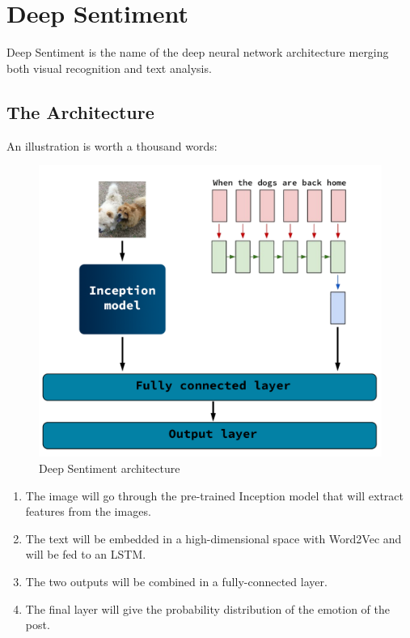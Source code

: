 \chapter{Deep Sentiment}

Deep Sentiment is the name of the deep neural network architecture merging both visual recognition and text analysis.

\section{The Architecture}
An illustration is worth a thousand words:

\begin{figure}[H]
    \centering
    \includegraphics[width=\textwidth]{Images/deep-sentiment.png}
    \caption{Deep Sentiment architecture}
\end{figure}

\begin{enumerate}
    \item The image will go through the pre-trained Inception model that will extract features from the images.
    \item The text will be embedded in a high-dimensional space with Word2Vec and will be fed to an LSTM.
    \item The two outputs will be combined in a fully-connected layer.
    \item The final layer will give the probability distribution of the emotion of the post.
\end{enumerate}





